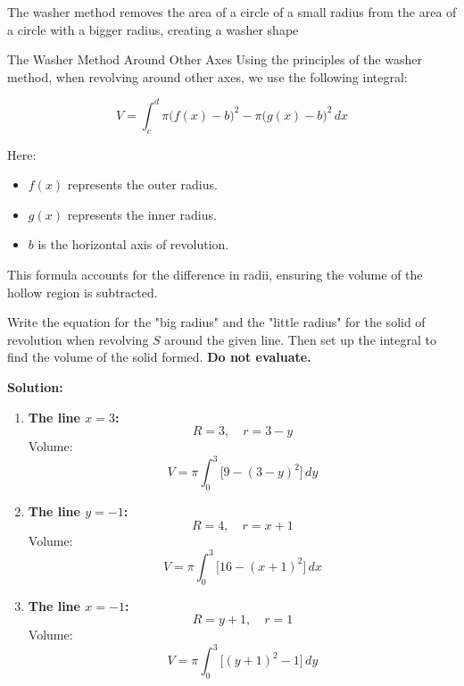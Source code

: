 \documentclass[12pt]{article}
\theoremstyle{beautifulthm}
\begin{document}
The washer method removes the area of a circle of a small radius from the area of a circle with a bigger radius, creating a washer shape

\begin{mytheorem}{The Washer Method Around Other Axes}{}
    Using the principles of the washer method, when revolving around other axes, we use the following integral:

\[
V = \int_{c}^{d} \pi \big(f(x) - b\big)^2 - \pi \big(g(x) - b\big)^2 \, dx
\]

Here:
\begin{itemize}
    \item $f(x)$ represents the outer radius.
    \item $g(x)$ represents the inner radius.
    \item $b$ is the horizontal axis of revolution.
\end{itemize}

This formula accounts for the difference in radii, ensuring the volume of the hollow region is subtracted.
\end{mytheorem}


\begin{tcolorbox}[colback=examplebg, colframe=red!75!black, title=\textbf{EXAMPLE 1:  Washer Method Around Other Axes}, fonttitle=\bfseries, sharp corners]


Write the equation for the "big radius" and the "little radius" for the solid of revolution when revolving $S$ around the given line. Then set up the integral to find the volume of the solid formed. \textbf{Do not evaluate.}

\tcblower
\textbf{Solution:} 
\begin{enumerate}
    \item[a.] \textbf{The line $x = 3$:}
    \[
    R = 3, \quad r = 3 - y
    \]
    Volume:
    \[
    V = \pi \int_{0}^{3} \big[9 - (3 - y)^2\big] \, dy
    \]

    \item[b.] \textbf{The line $y = -1$:}
    \[
    R = 4, \quad r = x + 1
    \]
    Volume:
    \[
    V = \pi \int_{0}^{3} \big[16 - (x + 1)^2\big] \, dx
    \]

    \item[c.] \textbf{The line $x = -1$:}
    \[
    R = y + 1, \quad r = 1
    \]
    Volume:
    \[
    V = \pi \int_{0}^{3} \big[(y + 1)^2 - 1\big] \, dy
    \]
\end{enumerate}

\end{tcolorbox}
\end{document}
